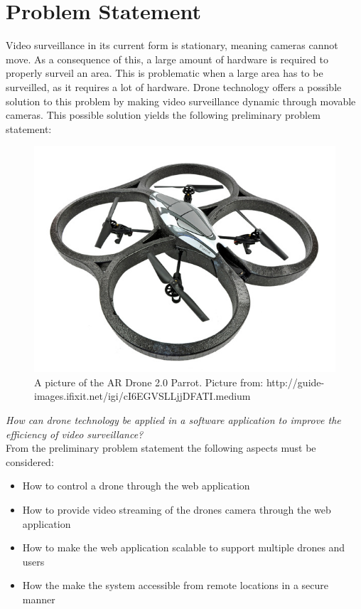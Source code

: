 \section{Problem Statement}
\label{sec:problem_definition}
Video surveillance in its current form is stationary, meaning cameras cannot move.
As a consequence of this, a large amount of hardware is required to properly surveil an area.
This is problematic when a large area has to be surveilled, as it requires a lot of hardware.
Drone technology offers a possible solution to this problem by making video surveillance dynamic through movable cameras.
This possible solution yields the following preliminary problem statement:\\

\begin{figure}[htb]
    \centering
    \includegraphics[width=\textwidth]{gfx/drone.jpg}
    \caption{A picture of the AR Drone 2.0 Parrot. Picture from: http://guide-images.ifixit.net/igi/cI6EGVSLLjjDFATI.medium}
    \label{fig:pic_of_drone}
\end{figure}

\textit{How can drone technology be applied in a software application to improve the efficiency of video surveillance?}\\

From the preliminary problem statement the following aspects must be considered:
\begin{itemize}
	\item How to control a drone through the web application
	\item How to provide video streaming of the drones camera through the web application
	\item How to make the web application scalable to support multiple drones and users
	\item How the make the system accessible from remote locations in a secure manner
\end{itemize}

